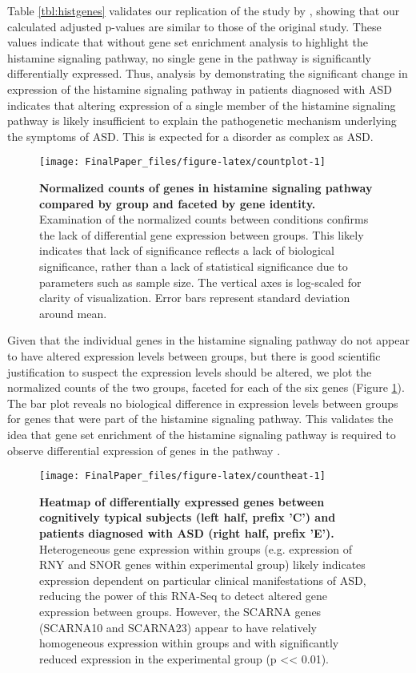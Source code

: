 Table \ref{tbl:histgenes} validates our replication of the study by
\citet{orig-paper}, showing that our calculated adjusted p-values are
similar to those of the original study. These values indicate that
without gene set enrichment analysis to highlight the histamine
signaling pathway, no single gene in the pathway is significantly
differentially expressed. Thus, analysis by \citet{orig-paper}
demonstrating the significant change in expression of the histamine
signaling pathway in patients diagnosed with ASD indicates that altering
expression of a single member of the histamine signaling pathway is
likely insufficient to explain the pathogenetic mechanism underlying the
symptoms of ASD. This is expected for a disorder as complex as ASD.

\begin{Schunk}
\begin{figure}
\texttt{[image: FinalPaper\_files/figure-latex/countplot-1]} \caption{\label{fig:countplot}\textbf{Normalized counts of genes in histamine signaling pathway compared by group and faceted by gene identity.} Examination of the normalized counts between conditions confirms the lack of differential gene expression between groups. This likely indicates that lack of significance reflects a lack of biological significance, rather than a lack of statistical significance due to parameters such as sample size. The vertical axes is log-scaled for clarity of visualization. Error bars represent standard deviation around mean.}\label{fig:countplot}
\end{figure}
\end{Schunk}

Given that the individual genes in the histamine signaling pathway do
not appear to have altered expression levels between groups, but there
is good scientific justification to suspect the expression levels should
be altered, we plot the normalized counts of the two groups, faceted for
each of the six genes (Figure \ref{fig:countplot}). The bar plot reveals
no biological difference in expression levels between groups for genes
that were part of the histamine signaling pathway. This validates the
idea that gene set enrichment of the histamine signaling pathway is
required to observe differential expression of genes in the pathway
\citep{orig-paper}.

\begin{Schunk}
\begin{figure}
\texttt{[image: FinalPaper\_files/figure-latex/countheat-1]} \caption{\label{fig:countheat}\textbf{Heatmap of differentially expressed genes between cognitively typical subjects (left half, prefix 'C') and patients diagnosed with ASD (right half, prefix 'E').} Heterogeneous gene expression within groups (e.g. expression of RNY and SNOR genes within experimental group) likely indicates expression dependent on particular clinical manifestations of ASD, reducing the power of this RNA-Seq to detect altered gene expression between groups. However, the SCARNA genes (SCARNA10 and SCARNA23) appear to have relatively homogeneous expression within groups and with significantly reduced expression in the experimental group (p << 0.01).}\label{fig:countheat}
\end{figure}
\end{Schunk}

